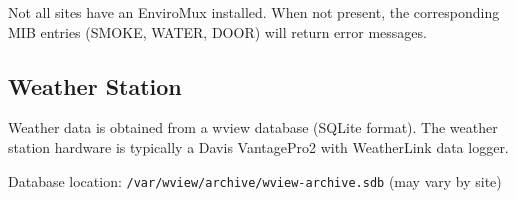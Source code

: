 \begin{siteNote}
Not all sites have an EnviroMux installed. When not present, the corresponding MIB entries (SMOKE, WATER, DOOR) will return error messages.
\end{siteNote}

\subsection{Weather Station}

Weather data is obtained from a wview database (SQLite format). The weather station hardware is typically a Davis VantagePro2 with WeatherLink data logger.

Database location: \texttt{/var/wview/archive/wview-archive.sdb} (may vary by site)
